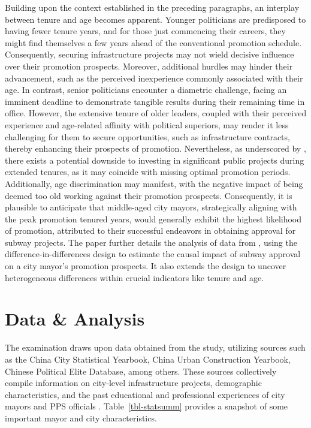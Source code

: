 \documentclass[12pt, ]{article}
\begin{document}
Building upon the context established in the preceding paragraphs, an
interplay between tenure and age becomes apparent. Younger politicians
are predisposed to having fewer tenure years, and for those just
commencing their careers, they might find themselves a few years ahead
of the conventional promotion schedule. Consequently, securing
infrastructure projects may not wield decisive influence over their
promotion prospects. Moreover, additional hurdles may hinder their
advancement, such as the perceived inexperience commonly associated with
their age. In contrast, senior politicians encounter a diametric
challenge, facing an imminent deadline to demonstrate tangible results
during their remaining time in office. However, the extensive tenure of
older leaders, coupled with their perceived experience and age-related
affinity with political superiors, may render it less challenging for
them to secure opportunities, such as infrastructure contracts, thereby
enhancing their prospects of promotion. Nevertheless, as underscored by
\citet{guo2009china}, there exists a potential downside to investing in
significant public projects during extended tenures, as it may coincide
with missing optimal promotion periods. Additionally, age discrimination
may manifest, with the negative impact of being deemed too old working
against their promotion prospects. Consequently, it is plausible to
anticipate that middle-aged city mayors, strategically aligning with the
peak promotion tenured years, would generally exhibit the highest
likelihood of promotion, attributed to their successful endeavors in
obtaining approval for subway projects. The paper further details the
analysis of data from \citet{lei2022private}, using the
difference-in-differences design to estimate the causal impact of subway
approval on a city mayor's promotion prospects. It also extends the
design to uncover heterogeneous differences within crucial indicators
like tenure and age.

\hypertarget{data-analysis}{%
\section{Data \& Analysis}\label{data-analysis}}

The examination draws upon data obtained from the \citet{lei2022private}
study, utilizing sources such as the China City Statistical Yearbook,
China Urban Construction Yearbook, Chinese Political Elite Database,
among others. These sources collectively compile information on
city-level infrastructure projects, demographic characteristics, and the
past educational and professional experiences of city mayors and PPS
officials \citep{lei2022private}. Table~\ref{tbl-statsumm} provides a
snapshot of some important mayor and city characteristics.
\end{document}
